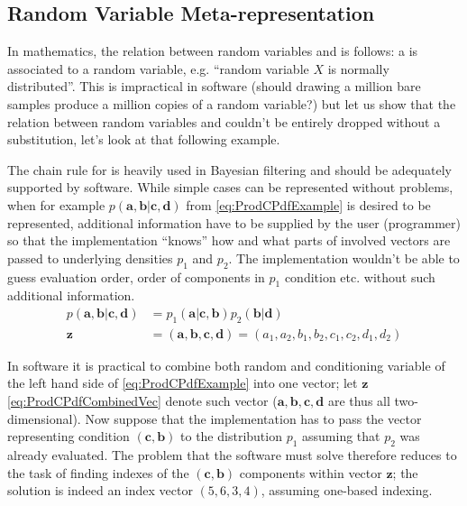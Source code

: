 \subsection{Random Variable Meta-representation}

In mathematics, the relation between random variables and {\pdfs} is follows: a {\pdf} is associated
to a random variable, e.g. ``random variable \(X\) is normally distributed''. This is impractical in
software (should drawing a million bare samples produce a million copies of a random variable?) but
let us show that the relation between random variables and {\pdfs} couldn't be entirely dropped
without a substitution, let's look at that following example.

The chain rule for {\pdfs} is heavily used in Bayesian filtering and should be adequately supported
by software. While simple cases can be represented without problems, when for example
\(p(\mathbf{a},\mathbf{b}|\mathbf{c},\mathbf{d})\)
from \eqref{eq:ProdCPdfExample} is desired to be represented, additional information have to be
supplied by the user (programmer) so that the implementation ``knows'' how and what parts of involved
vectors are passed to underlying densities \(p_1\) and \(p_2\). The implementation wouldn't be able
to guess evaluation order, order of components in \(p_1\) condition etc. without such additional
information.
\begin{align}
	p(\mathbf{a},\mathbf{b}|\mathbf{c},\mathbf{d}) &=
		p_1(\mathbf{a}|\mathbf{c},\mathbf{b}) p_2(\mathbf{b}|\mathbf{d}) \label{eq:ProdCPdfExample} \\
	\mathbf{z} &= (\mathbf{a}, \mathbf{b}, \mathbf{c}, \mathbf{d}) =
		(a_1, a_2, b_1, b_2, c_1, c_2, d_1, d_2)  \label{eq:ProdCPdfCombinedVec}
\end{align}

In software it is practical to combine both random and conditioning variable
of the left hand side of \eqref{eq:ProdCPdfExample} into one vector; let \(\mathbf{z}\)
\eqref{eq:ProdCPdfCombinedVec} denote such vector (\(\mathbf{a}, \mathbf{b}, \mathbf{c}, \mathbf{d}\)
are thus all two-dimensional). Now suppose that
the implementation has to pass the vector representing condition \((\mathbf{c}, \mathbf{b})\) to
the distribution \(p_1\) assuming that \(p_2\) was already evaluated. The problem that the software
must solve therefore reduces to the task of finding indexes of the \((\mathbf{c},\mathbf{b})\)
components within vector \(\mathbf{z}\); the solution is indeed an index vector \((5,6,3,4)\),
assuming one-based indexing.


